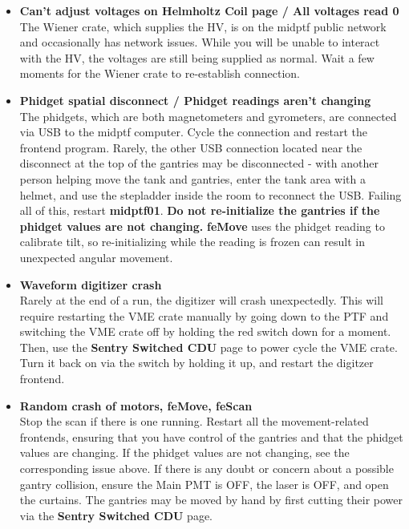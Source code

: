 \documentclass[twoside,letterpaper]{refart}
\begin{document}
\begin{itemize}

	\item \textbf{Can't adjust voltages on Helmholtz Coil page / All voltages read 0} \\The Wiener crate, which supplies the HV, is on the midptf public network and occasionally has network issues. While you will be unable to interact with the HV, the voltages are still being supplied as normal. Wait a few moments for the Wiener crate to re-establish connection.

	\item \textbf{Phidget spatial disconnect / Phidget readings aren't changing} \\The phidgets, which are both magnetometers and gyrometers, are connected via USB to the midptf computer. Cycle the connection and restart the frontend program. Rarely, the other USB connection located near the disconnect at the top of the gantries may be disconnected - with another person helping move the tank and gantries, enter the tank area with a helmet, and use the stepladder inside the room to reconnect the USB. Failing all of this, restart \textbf{midptf01}.  \textbf{Do not re-initialize the gantries if the phidget values are not changing.} \textbf{feMove} uses the phidget reading to calibrate tilt, so re-initializing while the reading is frozen can result in unexpected angular movement.

	\item \textbf{Waveform digitizer crash} \\Rarely at the end of a run, the digitizer will crash unexpectedly. This will require restarting the VME crate manually by going down to the PTF and switching the VME crate off by holding the red switch down for a moment. Then, use the \textbf{Sentry Switched CDU} page to power cycle the VME crate. Turn it back on via the switch by holding it up, and restart the digitzer frontend.

	\item \textbf{Random crash of motors, feMove, feScan} \\Stop the scan if there is one running. Restart all the movement-related frontends, ensuring that you have control of the gantries and that the phidget values are changing. If the phidget values are not changing, see the corresponding issue above. If there is any doubt or concern about a possible gantry collision, ensure the Main PMT is OFF, the laser is OFF, and open the curtains. The gantries may be moved by hand by first cutting their power via the \textbf{Sentry Switched CDU} page.

\end{itemize}
\end{document}
